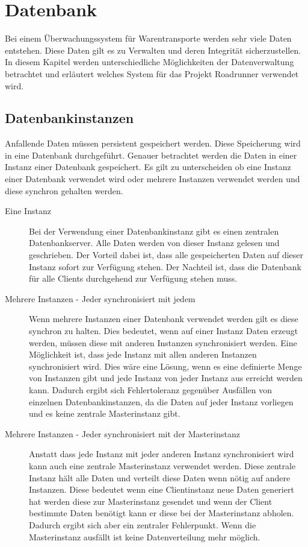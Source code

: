 \section{Datenbank}

Bei einem Überwachungssystem für Warentransporte werden sehr viele Daten entstehen. Diese Daten gilt es zu Verwalten und deren Integrität sicherzustellen. In diesem Kapitel werden unterschiedliche Möglichkeiten der Datenverwaltung betrachtet und erläutert welches System für das Projekt Roadrunner verwendet wird.

\subsection{Datenbankinstanzen}

Anfallende Daten müssen persistent gespeichert werden. Diese Speicherung wird in eine Datenbank durchgeführt. Genauer betrachtet werden die Daten in einer Instanz einer Datenbank gespeichert. Es gilt zu unterscheiden ob eine Instanz einer Datenbank verwendet wird oder mehrere Instanzen verwendet werden und diese synchron gehalten werden.

\begin{description}
	\item[Eine Instanz] Bei der Verwendung einer Datenbankinstanz gibt es einen zentralen Datenbankserver. Alle Daten werden von dieser Instanz gelesen und geschrieben. Der Vorteil dabei ist, dass alle gespeicherten Daten auf dieser Instanz sofort zur Verfügung stehen. Der Nachteil ist, dass die Datenbank für alle Clients durchgehend zur Verfügung stehen muss.
	\item[Mehrere Instanzen - Jeder synchronisiert mit jedem] Wenn mehrere Instanzen einer Datenbank verwendet werden gilt es diese synchron zu halten. Dies bedeutet, wenn auf einer Instanz Daten erzeugt werden, müssen diese mit anderen Instanzen synchronisiert werden. Eine Möglichkeit ist, dass jede Instanz mit allen anderen Instanzen synchronisiert wird. Dies wäre eine Lösung, wenn es eine definierte Menge von Instanzen gibt und jede Instanz von jeder Instanz aus erreicht werden kann. Dadurch ergibt sich Fehlertoleranz gegenüber Ausfällen von einzelnen Datenbankinstanzen, da die Daten auf jeder Instanz vorliegen und es keine zentrale Masterinstanz gibt.
	\item [Mehrere Instanzen - Jeder synchronisiert mit der Masterinstanz] Anstatt dass jede Instanz mit jeder anderen Instanz synchronisiert wird kann auch eine zentrale Masterinstanz verwendet werden. Diese zentrale Instanz hält alle Daten und verteilt diese Daten wenn nötig auf andere Instanzen. Diese bedeutet wenn eine Clientinstanz neue Daten generiert hat werden diese zur Masterinstanz gesendet und wenn der Client bestimmte Daten benötigt kann er diese bei der Masterinstanz abholen. Dadurch ergibt sich aber ein zentraler Fehlerpunkt. Wenn die Masterinstanz ausfällt ist keine Datenverteilung mehr möglich. 
\end{description}

